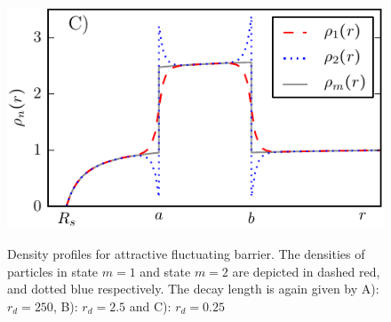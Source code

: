 \begin{minipage}[t]{0.5 \textwidth}
    \begin{figure}[H]
        \includegraphics[width = 1 \textwidth]{plots/d6.pdf}
    \end{figure}
\end{minipage}\hspace{0.07\textwidth}\begin{minipage}[t]{0.43 \textwidth}
    \begin{figure}[H]
        \caption{Density profiles for attractive fluctuating barrier. The densities of particles in state $m=1$ and state $m=2$ are depicted in dashed red, and dotted blue respectively. The decay length is again given by A): $r_d = 250$, B): $r_d=2.5$ and C): $r_d=0.25$ \label{asd}}
    \end{figure}
\end{minipage} 
\newpage
